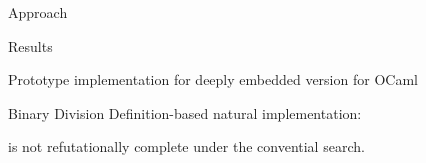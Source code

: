 \documentclass[final,20pt]{beamer}
\begin{document}
\begin{frame}[t]
\begin{columns}[t]
\begin{column}{\onecolwid}
\begin{block}{Approach}
      \end{block}
   
    \begin{block}{Results}
    
    \vskip5mm
    
    Prototype implementation for deeply embedded version for OCaml
    \vskip8mm    


 


        
    

      

      \begin{exampleblock}{Binary Division}
        \justifying
        Definition-based natural implementation:

        \bigskip
        
        \bigskip
        
        is not refutationally complete under the convential search.
        

\end{exampleblock}
\end{block}
\end{column}
\end{columns}
\end{frame}
\end{document}
